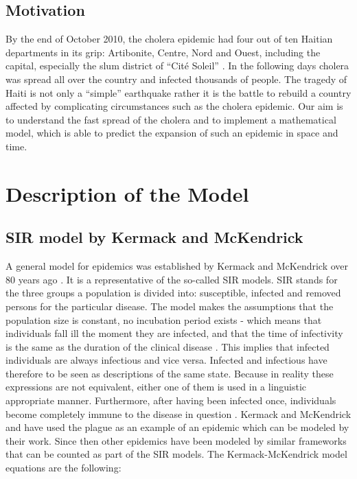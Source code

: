 \documentclass[11pt]{article}
\begin{document}
\subsection{Motivation}
By the end of October 2010, the cholera epidemic had four out of ten Haitian departments in its grip: Artibonite, Centre, Nord and Ouest, including the capital, especially the slum district of “Cit\'{e} Soleil” \cite{web:alj2}. In the following days cholera was spread all over the country and infected thousands of people. The tragedy of Haiti is not only a “simple” earthquake rather it is the battle to rebuild a country affected by complicating circumstances such as the cholera epidemic. Our aim is to understand the fast spread of the cholera and to implement a mathematical model, which is able to predict the expansion of such an epidemic in space and time.













\section{Description of the Model}
\subsection{SIR model by Kermack and McKendrick}
A general model for epidemics was established by Kermack and McKendrick over 80 years ago \cite{kermack:1927}. It is a representative of the so-called SIR models. SIR stands for the three groups a population is divided into: susceptible, infected and removed persons for the particular disease. The model makes the assumptions that the population size is constant, no incubation period exists - which means that individuals fall ill the moment they are infected, and that the time of infectivity is the same as the duration of the clinical disease \cite{kermack:1927}. This implies that infected individuals are always infectious and vice versa. Infected and infectious have therefore to be seen as descriptions of the same state. Because in reality these expressions are not equivalent, either one of them is used in a linguistic appropriate manner. Furthermore, after having been infected once, individuals become completely immune to the disease in question \cite{kermack:1927}. Kermack and McKendrick and have used the plague as an example of an epidemic which can be modeled by their work. Since then other epidemics have been modeled by similar frameworks that can be counted as part of the SIR models. The Kermack-McKendrick model equations are the following:
\end{document}

